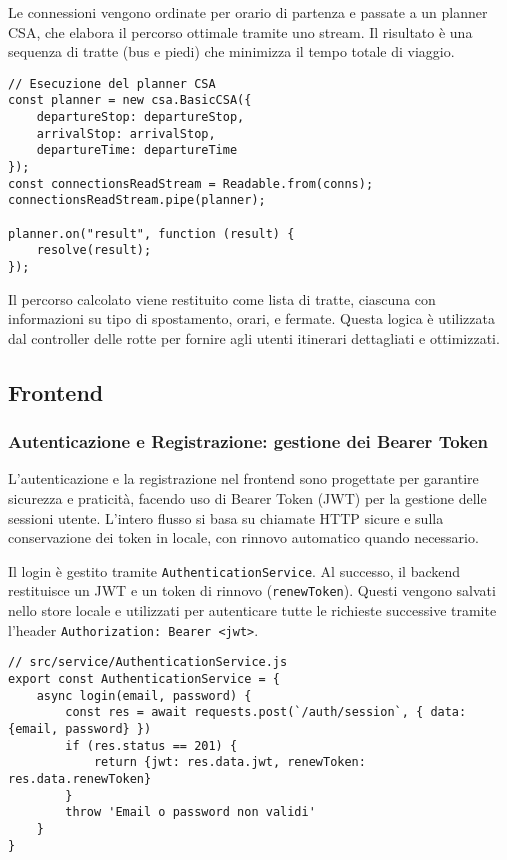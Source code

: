 Le connessioni vengono ordinate per orario di partenza e passate a un planner CSA, che elabora il percorso ottimale tramite uno stream. Il risultato è una sequenza di tratte (bus e piedi) che minimizza il tempo totale di viaggio.

\begin{lstlisting}
// Esecuzione del planner CSA
const planner = new csa.BasicCSA({
    departureStop: departureStop,
    arrivalStop: arrivalStop,
    departureTime: departureTime
});
const connectionsReadStream = Readable.from(conns);
connectionsReadStream.pipe(planner);

planner.on("result", function (result) {
    resolve(result);
});
\end{lstlisting}

Il percorso calcolato viene restituito come lista di tratte, ciascuna con informazioni su tipo di spostamento, orari, e fermate. Questa logica è utilizzata dal controller delle rotte per fornire agli utenti itinerari dettagliati e ottimizzati.

\subsection{Frontend}

\subsubsection{Autenticazione e Registrazione: gestione dei Bearer Token}

L'autenticazione e la registrazione nel frontend sono progettate per garantire sicurezza e praticità, facendo uso di Bearer Token (JWT) per la gestione delle sessioni utente. L'intero flusso si basa su chiamate HTTP sicure e sulla conservazione dei token in locale, con rinnovo automatico quando necessario.

Il login è gestito tramite \texttt{AuthenticationService}. Al successo, il backend restituisce un JWT e un token di rinnovo (\texttt{renewToken}). Questi vengono salvati nello store locale e utilizzati per autenticare tutte le richieste successive tramite l'header \texttt{Authorization: Bearer <jwt>}.

\begin{lstlisting}
// src/service/AuthenticationService.js
export const AuthenticationService = {
    async login(email, password) {
        const res = await requests.post(`/auth/session`, { data: {email, password} })
        if (res.status == 201) {
            return {jwt: res.data.jwt, renewToken: res.data.renewToken}
        }
        throw 'Email o password non validi'
    }
}
\end{lstlisting}

